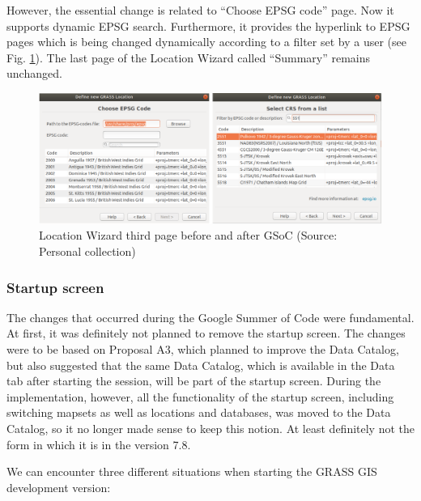 \documentclass[a4paper,10pt,twoside]{article}
\begin{document}
\newpage
However, the essential change is related to ``Choose EPSG code'' page. Now it supports dynamic EPSG search. Furthermore, it provides the hyperlink to EPSG pages which is being changed dynamically according to a filter set by a user (see Fig. \ref{fig:loc_wiz_3}). The last page of the Location Wizard called ``Summary'' remains unchanged.


\vspace{0.3cm}
\begin{figure}[hbt!] 
\begin{center}
\includegraphics[width=17cm]{../pictures/loc_wiz_3.png} 
\caption[Location Wizard third page before and after GSoC)]{Location Wizard third page before and after GSoC (Source: Personal collection)}
\label{fig:loc_wiz_3}
\end{center}
\end{figure}

\vspace*{-1cm}
\subsubsection{Startup screen}

The changes that occurred during the Google Summer of Code were fundamental. At first, it was definitely not planned to remove the startup screen. The changes were to be based on Proposal A3, which planned to improve the Data Catalog, but also suggested that the same Data Catalog, which is available in the Data tab after starting the session, will be part of the startup screen.
During the implementation, however, all the functionality of the startup screen, including switching mapsets as well as locations and databases, was moved to the Data Catalog, so it no longer made sense to keep this notion. At least definitely not the form in which it is in the version 7.8.

\noindent We can encounter three different situations when starting the GRASS GIS development version:
\end{document}
